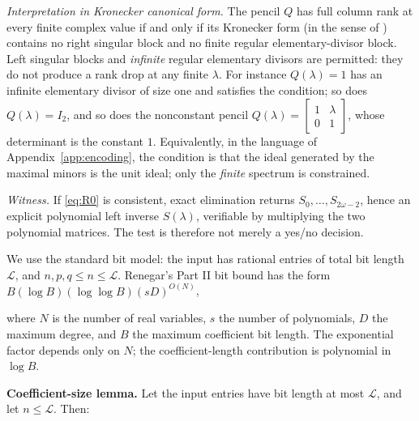 \documentclass[journal]{IEEEtran}
\theoremstyle{plainn}
\begin{document}
\emph{Interpretation in Kronecker canonical form.} The pencil $Q$ has full column rank at every finite complex value if and only if its Kronecker form (in the sense of \cite{bee88}) contains no right singular block and no finite regular elementary-divisor block. Left singular blocks and \emph{infinite} regular elementary divisors are permitted: they do not produce a rank drop at any finite $\lambda$. For instance $Q(\lambda)=1$ has an infinite elementary divisor of size one and satisfies the condition; so does $Q(\lambda)=I_2$, and so does the nonconstant pencil $Q(\lambda)=\begin{bmatrix}1&\lambda\\0&1\end{bmatrix}$, whose determinant is the constant $1$. Equivalently, in the language of Appendix~\ref{app:encoding}, the condition is that the ideal generated by the maximal minors is the unit ideal; only the \emph{finite} spectrum is constrained.

\emph{Witness.} If \eqref{eq:R0} is consistent, exact elimination returns $S_0,\dots,S_{2\omega-2}$, hence an explicit polynomial left inverse $S(\lambda)$, verifiable by multiplying the two polynomial matrices. The test is therefore not merely a yes/no decision.


We use the standard bit model: the input has rational entries of total bit length $\mathcal L$, and $n,p,q\le n\le\mathcal L$. Renegar's Part II bit bound \cite{ren92} has the form $B(\log B)(\log\log B)(sD)^{O(N)}$,

where $N$ is the number of real variables, $s$ the number of polynomials, $D$ the maximum degree, and $B$ the maximum coefficient bit length. The exponential factor depends only on $N$; the coefficient-length contribution is polynomial in $\log B$.

\textbf{Coefficient-size lemma.} Let the input entries have bit length at most $\mathcal L$, and let $n\le\mathcal L$. Then:
\end{document}
